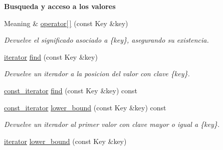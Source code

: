 \begin{Indent}{\bf \-Busqueda y acceso a los valores}
\begin{DoxyCompactItemize}
\-Meaning \& \hyperlink{classaed2_1_1map_a96f23896164ab47bee48c26b803f9801}{operator\mbox{[}$\,$\mbox{]}} (const \-Key \&key)
\begin{DoxyCompactList}\small\item\em \-Devuelve el significado asociado a \{key\}, asegurando su existencia. \end{DoxyCompactList}\item 
\hyperlink{classaed2_1_1map_1_1iterator}{iterator} \hyperlink{classaed2_1_1map_afd0fc1a8234888e61e0e615de7e245b8}{find} (const \-Key \&key)
\begin{DoxyCompactList}\small\item\em \-Devuelve un iterador a la posicion del valor con clave \{key\}. \end{DoxyCompactList}\item 
\hyperlink{classaed2_1_1map_1_1const__iterator}{const\-\_\-iterator} \hyperlink{classaed2_1_1map_ab8f3e41b1a0d7b74645836f8d2e1acfc}{find} (const \-Key \&key) const 
\item 
\hyperlink{classaed2_1_1map_1_1const__iterator}{const\-\_\-iterator} \hyperlink{classaed2_1_1map_a3399d36fdd5a880b494f3a5795d3f18f}{lower\-\_\-bound} (const \-Key \&key) const 
\begin{DoxyCompactList}\small\item\em \-Devuelve un iterador al primer valor con clave mayor o igual a \{key\}. \end{DoxyCompactList}\item 
\hyperlink{classaed2_1_1map_1_1iterator}{iterator} \hyperlink{classaed2_1_1map_a07b3dd65557c59ee085e5f211269c6b3}{lower\-\_\-bound} (const \-Key \&key)
\end{DoxyCompactItemize}
\end{Indent}
